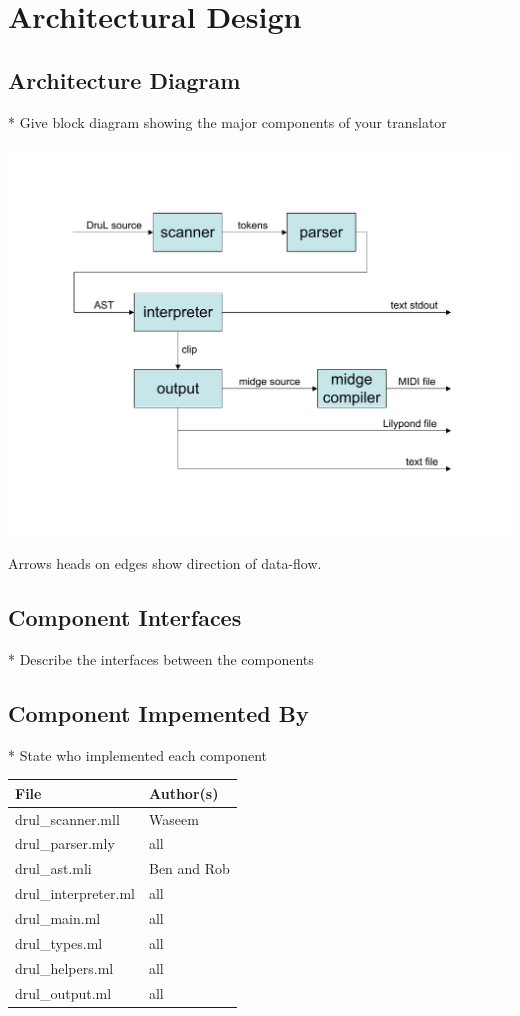 
\chapter{Architectural Design}

\section{Architecture Diagram}
* Give block diagram showing the major components of your translator

\includegraphics[width=150mm]{Architecture_diagram.pdf}

Arrows heads on edges show direction of data-flow.

\section{Component Interfaces}
* Describe the interfaces between the components

\section{Component Impemented By}
* State who implemented each component

\begin{tabular}{ | l | l | } \hline
	\textbf{File}        & \textbf{Author(s)} \\ \hline \hline
	drul\_scanner.mll    & Waseem             \\ \hline
	drul\_parser.mly     & all                \\ \hline
	drul\_ast.mli        & Ben and Rob        \\ \hline
	drul\_interpreter.ml & all                \\ \hline
	drul\_main.ml        & all                \\ \hline
	drul\_types.ml       & all                \\ \hline
	drul\_helpers.ml     & all                \\ \hline
	drul\_output.ml      & all                \\ \hline
\end{tabular}


